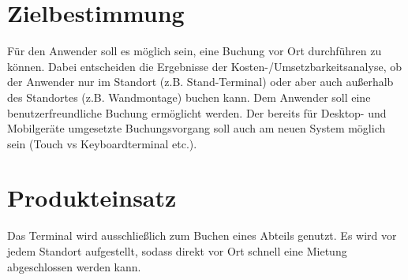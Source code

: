 
\section{Zielbestimmung}
Für den Anwender soll es möglich sein, eine Buchung vor Ort durchführen zu können. Dabei entscheiden die Ergebnisse der Kosten-/Umsetzbarkeitsanalyse, ob der Anwender nur im Standort (z.B. Stand-Terminal) oder aber auch außerhalb des Standortes (z.B. Wandmontage) buchen kann. Dem Anwender soll eine benutzerfreundliche Buchung ermöglicht werden. Der bereits für Desktop- und Mobilgeräte umgesetzte Buchungsvorgang soll auch am neuen System möglich sein (Touch vs Keyboardterminal etc.). 

\section{Produkteinsatz}
Das Terminal wird ausschließlich zum Buchen eines Abteils genutzt. Es wird vor jedem Standort aufgestellt, sodass direkt vor Ort schnell eine Mietung abgeschlossen werden kann.